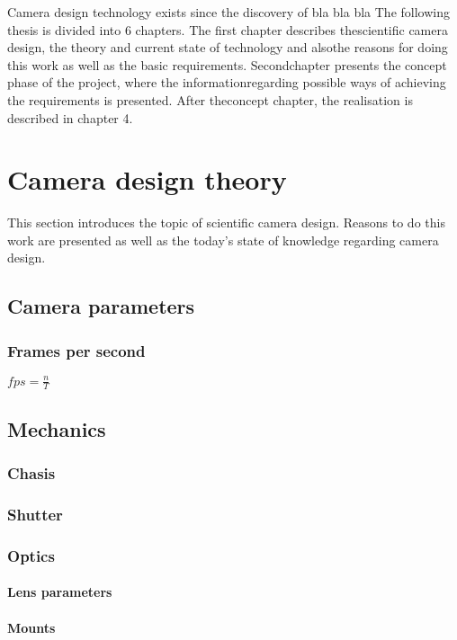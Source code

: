 

Camera design technology exists since the discovery of bla bla bla
The following thesis is divided into 6 chapters. The first chapter describes thescientific camera design, the theory and
current state of technology and alsothe reasons for doing this work as well as the basic requirements. Secondchapter
presents the concept phase of the project, where the informationregarding possible ways of achieving the requirements is
presented. After theconcept chapter, the realisation is described in chapter 4.

\section{Camera design theory}

    This section introduces the topic of scientific camera design. Reasons to do this work are presented as well as 
    the today's state of knowledge regarding camera design.  

    \subsection{Camera parameters}

      \subsubsection{Frames per second}
      $ fps = \frac{n}{T} $ 
    \subsection{Mechanics}
      \subsubsection{Chasis}
      \subsubsection{Shutter}
      \subsubsection{Optics}
         \paragraph{Lens parameters}
         \paragraph{Mounts}

